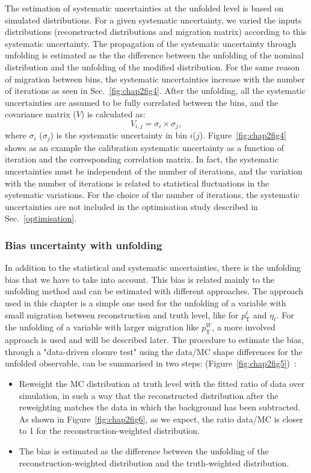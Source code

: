 The estimation of systematic uncertainties at the unfolded level is based on simulated distributions. For a given systematic uncertainty, we varied the inputs distributions (reconstructed distributions and migration matrix) according to this systematic uncertainty. The propagation of the systematic uncertainty through unfolding is estimated as the the difference between the unfolding of the nominal distribution and the unfolding of the modified distribution. For the same reason of migration between bins, the systematic uncertainties increase with the number of iterations as seen in Sec.~\ref{fig:chap2fig4}.  After the unfolding, all the systematic uncertainties are assumed to be fully correlated between the bins, and the covariance matrix ($V$) is calculated as:
%
\begin{equation}
V_{i,j}=\sigma_{i} \times \sigma_{j},
\end{equation}
%
\noindent where {$\sigma_{i}$} ({$\sigma_{j}$}) is the systematic uncertainty in bin {$i$}({$j$}). Figure~\ref{fig:chap2fig4} shows as an example the calibration systematic uncertainty as a function of iteration and the corresponding correlation matrix. 
In fact, the systematic uncertainties must be independent of the number of iterations, and the variation with the number of iterations is related to statistical fluctuations in the systematic variations. For the choice of the number of iterations, the systematic uncertainties are not included in the optimisation study described in Sec.~\ref{optimisation}.



\subsubsection{Bias uncertainty with unfolding}
\label{biasref}
In addition to the statistical and systematic uncertainties, there is the unfolding bias that we have to take into account. This bias is related mainly to the unfolding method and can be estimated with different approaches. The approach used in this chapter is a simple one used for the unfolding of a variable with small migration between reconstruction and truth level, like for $p_\mathrm{T}^\ell$ and $\eta_\ell$. For the unfolding of a variable with larger migration like $p_\mathrm{T}^W$, a more involved approach is used and will be described later. The procedure to estimate the bias, through a "data-driven closure test" using the data/MC shape differences for the unfolded observable, can be summarised in two steps: (Figure~\ref{fig:chap2fig5})~\cite{Unfoldingtwikipage}:
%
\begin{itemize}
\sloppy
\item Reweight the MC distribution at truth level with the fitted ratio of data over simulation, in such a way that the reconstructed distribution after the reweighting matches the data in which the background has been subtracted. As shown in Figure~\ref{fig:chap2fig6}, as we expect, the ratio data/MC is closer to 1 for the reconstruction-weighted distribution. 
%
\item The bias is estimated as the difference between the unfolding of the reconstruction-weighted distribution
      and the truth-weighted distribution.
\end{itemize}


